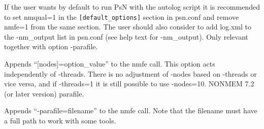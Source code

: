 \begin{optionlist}
If the user wants by default to run PsN with the autolog script it is recommended to set nmqual=1 in the 
\verb|[default_options]| section in psn.conf and remove nmfe=1 from the same section. The user should also consider to add log.xml to the -nm\_output list in psn.conf (see help text for -nm\_output).
\nextopt
{}
Only relevant together with option -parafile. 

Appends “[nodes]=option\_value” to the nmfe call. This option acts independently of -threads. There is no adjustment of -nodes based on -threads or vice versa, and if -threads=1 it is still possible to use -nodes=10. 
\nextopt
{}
NONMEM 7.2 (or later version) parafile.

Appends “-parafile=filename” to the nmfe call. 
Note that the filename must have a full path to work with some tools.
\nextopt
\end{optionlist}
